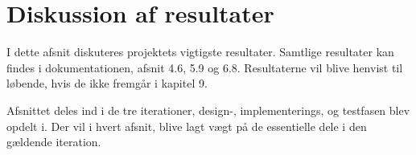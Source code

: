 
\chapter{Diskussion af resultater} \label{diskussion}
I dette afsnit diskuteres projektets vigtigste resultater. Samtlige resultater kan findes i dokumentationen, afsnit 4.6, 5.9 og 6.8. Resultaterne vil blive henvist til løbende, hvis de ikke fremgår i kapitel 9. 

\noindent Afsnittet deles ind i de tre iterationer, design-, implementerings, og testfasen blev opdelt i. Der vil i hvert afsnit, blive lagt vægt på de essentielle dele i den gældende iteration.





